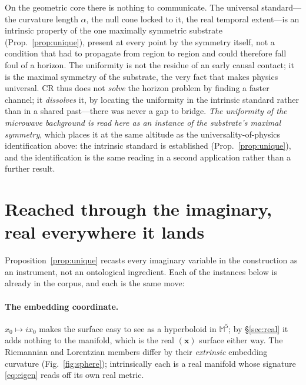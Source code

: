 \documentclass[11pt,a4paper]{article}
\theoremstyle{definition}
\begin{document}
On the geometric core there is nothing to communicate. The universal
standard---the curvature length $\alpha$, the null cone locked to it, the
real temporal extent---is an intrinsic property of the one maximally
symmetric substrate (Prop.~\ref{prop:unique}), present at every point by the
symmetry itself, not a condition that had to propagate from region to region
and could therefore fall foul of a horizon. The uniformity is not the residue
of an early causal contact; it is the maximal symmetry of the substrate, the
very fact that makes physics universal. CR thus does not \emph{solve} the
horizon problem by finding a faster channel; it \emph{dissolves} it, by
locating the uniformity in the intrinsic standard rather than in a shared
past---there was never a gap to bridge. \emph{The uniformity of the microwave background
is read here as an instance of the substrate's maximal symmetry}, which places it at the
same altitude as the universality-of-physics identification above: the intrinsic standard
is established (Prop.~\ref{prop:unique}), and the identification is the same reading in a
second application rather than a further result.

\section{Reached through the imaginary, real everywhere it lands}\label{sec:imaginary}

Proposition~\ref{prop:unique} recasts every imaginary variable in the
construction as an instrument, not an ontological ingredient. Each of the
instances below is already in the corpus, and each is the same move:

\paragraph{The embedding coordinate.} $x_0\mapsto ix_0$ makes the surface
easy to see as a hyperboloid in $\mathbb{M}^5$; by
\S\ref{sec:real} it adds nothing to the manifold, which is the real
$(\mathbf{x})$ surface either way. The Riemannian and Lorentzian members
differ by their \emph{extrinsic} embedding curvature (Fig.~\ref{fig:sphere});
intrinsically each is a real manifold whose signature \eqref{eq:eigen}
reads off its own real metric.
\end{document}
